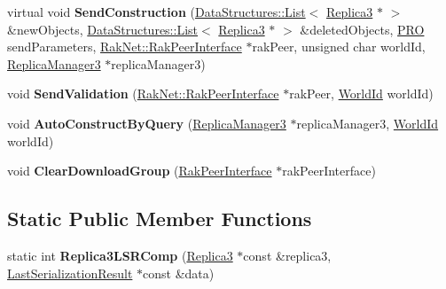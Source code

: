\begin{DoxyCompactItemize}
\item 
\hypertarget{class_rak_net_1_1_connection___r_m3_a7adfc9abdd614426330d1b673669205b}{virtual void {\bfseries Send\-Construction} (\hyperlink{class_data_structures_1_1_list}{Data\-Structures\-::\-List}$<$ \hyperlink{class_rak_net_1_1_replica3}{Replica3} $\ast$ $>$ \&new\-Objects, \hyperlink{class_data_structures_1_1_list}{Data\-Structures\-::\-List}$<$ \hyperlink{class_rak_net_1_1_replica3}{Replica3} $\ast$ $>$ \&deleted\-Objects, \hyperlink{struct_rak_net_1_1_p_r_o}{P\-R\-O} send\-Parameters, \hyperlink{class_rak_net_1_1_rak_peer_interface}{Rak\-Net\-::\-Rak\-Peer\-Interface} $\ast$rak\-Peer, unsigned char world\-Id, \hyperlink{class_rak_net_1_1_replica_manager3}{Replica\-Manager3} $\ast$replica\-Manager3)}\label{class_rak_net_1_1_connection___r_m3_a7adfc9abdd614426330d1b673669205b}

\item 
\hypertarget{class_rak_net_1_1_connection___r_m3_ad6733eefbdf9b397266569681bf76c39}{void {\bfseries Send\-Validation} (\hyperlink{class_rak_net_1_1_rak_peer_interface}{Rak\-Net\-::\-Rak\-Peer\-Interface} $\ast$rak\-Peer, \hyperlink{group___r_e_p_l_i_c_a___m_a_n_a_g_e_r___g_r_o_u_p3_ga44b59af8e882248f61aa41d8ace38bf7}{World\-Id} world\-Id)}\label{class_rak_net_1_1_connection___r_m3_ad6733eefbdf9b397266569681bf76c39}

\item 
\hypertarget{class_rak_net_1_1_connection___r_m3_a1cad1219c8fd296aae5ea65e7f7331c3}{void {\bfseries Auto\-Construct\-By\-Query} (\hyperlink{class_rak_net_1_1_replica_manager3}{Replica\-Manager3} $\ast$replica\-Manager3, \hyperlink{group___r_e_p_l_i_c_a___m_a_n_a_g_e_r___g_r_o_u_p3_ga44b59af8e882248f61aa41d8ace38bf7}{World\-Id} world\-Id)}\label{class_rak_net_1_1_connection___r_m3_a1cad1219c8fd296aae5ea65e7f7331c3}

\item 
\hypertarget{class_rak_net_1_1_connection___r_m3_a0f3a181abb2c8f48ae43fdb9bdcd72bf}{void {\bfseries Clear\-Download\-Group} (\hyperlink{class_rak_net_1_1_rak_peer_interface}{Rak\-Peer\-Interface} $\ast$rak\-Peer\-Interface)}\label{class_rak_net_1_1_connection___r_m3_a0f3a181abb2c8f48ae43fdb9bdcd72bf}

\end{DoxyCompactItemize}
\subsection*{Static Public Member Functions}
\begin{DoxyCompactItemize}
\item 
\hypertarget{class_rak_net_1_1_connection___r_m3_a02709edcb8de5bb49cd606f1b49cf5a7}{static int {\bfseries Replica3\-L\-S\-R\-Comp} (\hyperlink{class_rak_net_1_1_replica3}{Replica3} $\ast$const \&replica3, \hyperlink{struct_rak_net_1_1_last_serialization_result}{Last\-Serialization\-Result} $\ast$const \&data)}\label{class_rak_net_1_1_connection___r_m3_a02709edcb8de5bb49cd606f1b49cf5a7}

\end{DoxyCompactItemize}
